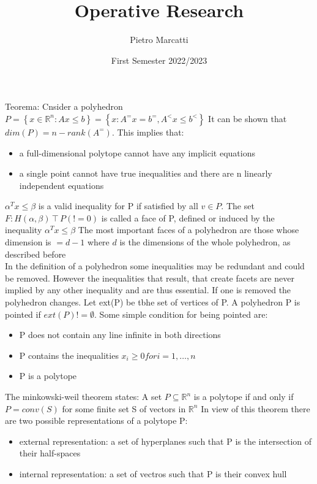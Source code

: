 \documentclass{article}
\title{Operative Research}
\author{Pietro Marcatti}
\date{First Semester 2022/2023}
\begin{document}
    \maketitle
    Teorema: Cnsider a polyhedron
    $P = \left\{ x \in \mathbb{R}^n : Ax\leq b \right\} = \left\{ x: A^=x = b^=, A^<x \leq b^< \right\}$
    It can be shown that $dim(P) = n - rank(A^=)$.
    This implies that:
    \begin{itemize}
        \item a full-dimensional polytope cannot have any implicit equations
        \item a single point cannot have true inequalities and there are n linearly independent equations
    \end{itemize}
    $\alpha^T x \leq \beta$ is a valid inequality for P if satisfied by all $v \in P$. The set $F: H(\alpha, \beta) \intercal P(!=0)$ is called a face of P, defined or induced by the inequality
    $\alpha^T x \leq \beta$
    The most important faces of a polyhedron are those whose dimension is $ = d- 1$ where $d$ is the dimensions of the whole polyhedron, as described before\\
    In the definition of a polyhedron some inequalities may be redundant and could be removed. However the inequalities that result, that create
    facets are never implied by any other inequality and are thus essential. If one is removed the polyhedron changes. \newline
    Let ext(P) be tbhe set of vertices of P. A polyhedron P is pointed if $ext(P) != \emptyset$. Some simple condition for being pointed are:
    \begin{itemize}
        \item P does not contain any line infinite in both directions
        \item P contains the inequalities $x_i \geq 0 for i= 1, \ldots, n$
        \item P is a polytope
    \end{itemize}
    The minkowski-weil theorem states: A set $P \subseteq \mathbb{R}^n $ is a polytope if and only if $P = conv(S)$ for some finite set S of vectors in $\mathbb{R}^n$
    In view of this theorem there are two possible representations of a polytope P:
    \begin{itemize}
        \item external representation: a set of hyperplanes such that P is the intersection of their half-spaces
        \item internal representation: a set of vectros such that P is their convex hull
    \end{itemize}
\end{document}
